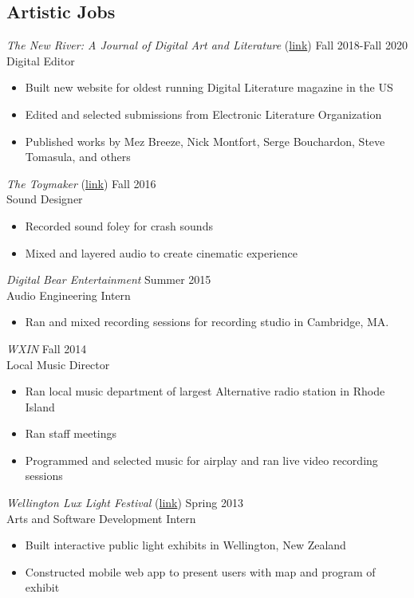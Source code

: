 \subsection{Artistic Jobs}

\emph{The New River: A Journal of Digital Art and Literature} (\href{http://thenewriver.us/}{link}) \hfill
 Fall 2018-Fall 2020 \\
 Digital Editor  \\
 \begin{itemize}
 \item Built new website for oldest running Digital Literature magazine in the US
 \item Edited and selected submissions from Electronic Literature Organization
 \item Published works by Mez Breeze, Nick Montfort, Serge Bouchardon, Steve Tomasula, and others
 \end{itemize}
 
 \emph{The Toymaker} (\href{https://vimeo.com/242488116}{link}) \hfill
Fall 2016 \\
Sound Designer  \\
 \begin{itemize}
 \item Recorded sound foley for crash sounds
 \item Mixed and layered audio to create cinematic experience
 \end{itemize}

{\sl Digital Bear Entertainment} \hfill
Summer 2015 \\
Audio Engineering Intern \\
\begin{itemize}
\item Ran and mixed recording sessions for recording studio in Cambridge, MA.
\end{itemize}

{\sl WXIN} \hfill
Fall 2014 \\
Local Music Director \\
\begin{itemize}
\item Ran local music department of largest Alternative radio station in Rhode Island
\item Ran staff meetings
\item Programmed and selected music for airplay and ran live video recording sessions 
\end{itemize}

{\sl Wellington Lux Light Festival}  (\href{https://www.facebook.com/LUXLightfestival/}{link}) \hfill Spring 2013 \\
Arts and Software Development Intern \\
\begin{itemize}
\item Built interactive public light exhibits in Wellington, New Zealand
\item Constructed mobile web app to present users with map and program of exhibit 
\end{itemize}